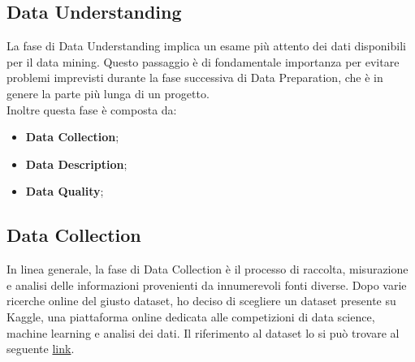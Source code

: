 \documentclass{article}
\begin{document}
\begin{titlepage}
        \newpage
        \section{Data Understanding}
        La fase di Data Understanding implica un esame più attento dei dati disponibili per il data mining. Questo passaggio è di fondamentale importanza per evitare problemi imprevisti durante la fase successiva di Data Preparation, che è in genere la parte più lunga di un progetto. \\
        Inoltre questa fase è composta da:
        \begin{itemize}
            \item \textbf{Data Collection};
            \item \textbf{Data Description};
            \item \textbf{Data Quality};
        \end{itemize}

         \subsection{Data Collection}
         In linea generale, la fase di Data Collection è il processo di raccolta, misurazione e analisi delle informazioni provenienti da innumerevoli fonti diverse. Dopo varie ricerche online del giusto dataset, ho deciso di scegliere un dataset presente su Kaggle,  una piattaforma online dedicata alle competizioni di data science, machine learning e analisi dei dati. Il riferimento al dataset lo si può trovare al seguente \href{https://www.kaggle.com/datasets/uciml/red-wine-quality-cortez-et-al-2009}{link}.


\end{titlepage}
\end{document}
